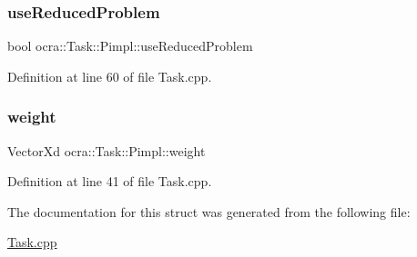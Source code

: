 \hypertarget{structocra_1_1Task_1_1Pimpl_a3212017ae655edc8559498c773f0285f}{}\label{structocra_1_1Task_1_1Pimpl_a3212017ae655edc8559498c773f0285f} 
\subsubsection{\texorpdfstring{use\+Reduced\+Problem}{useReducedProblem}}
{\footnotesize\ttfamily bool ocra\+::\+Task\+::\+Pimpl\+::use\+Reduced\+Problem}



Definition at line 60 of file Task.\+cpp.

\hypertarget{structocra_1_1Task_1_1Pimpl_ab2c51ef740079f8fae0f8e3de1b20d08}{}\label{structocra_1_1Task_1_1Pimpl_ab2c51ef740079f8fae0f8e3de1b20d08} 
\subsubsection{\texorpdfstring{weight}{weight}}
{\footnotesize\ttfamily Vector\+Xd ocra\+::\+Task\+::\+Pimpl\+::weight}



Definition at line 41 of file Task.\+cpp.



The documentation for this struct was generated from the following file\+:\begin{DoxyCompactItemize}
\item 
\hyperlink{Task_8cpp}{Task.\+cpp}\end{DoxyCompactItemize}
